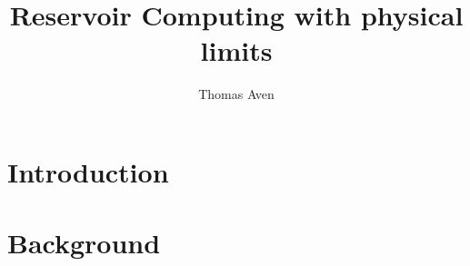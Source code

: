 \documentclass[journal]{IEEEtran}
\begin{document}
\title{Reservoir Computing with physical limits}
\author{Thomas Aven}
\date{}
\maketitle



\section{Introduction}


\section{Background}




\end{document}
